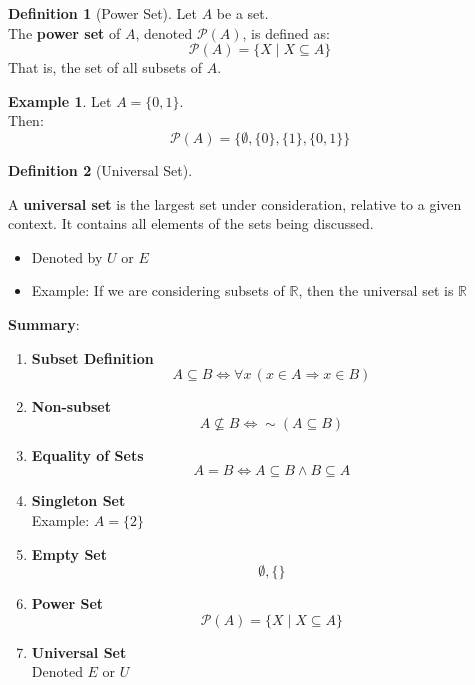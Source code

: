 \documentclass[
]{book}
\providecommand{\tightlist}{%
  \setlength{\itemsep}{0pt}\setlength{\parskip}{0pt}}
\theoremstyle{definition}
\newtheorem{definition}{Definition}[chapter]
\theoremstyle{definition}
\newtheorem{example}{Example}[chapter]
\theoremstyle{definition}
\theoremstyle{definition}
\theoremstyle{remark}
\begin{document}
\begin{definition}[Power Set]
\protect\hypertarget{def:unnamed-chunk-129}{}\label{def:unnamed-chunk-129}Let \(A\) be a set.\\
The \textbf{power set} of \(A\), denoted \(\mathcal{P}(A)\), is defined as:
\[
\mathcal{P}(A) = \{X \mid X \subseteq A\}
\]
That is, the set of all subsets of \(A\).
\end{definition}

\begin{example}
\protect\hypertarget{exm:unnamed-chunk-130}{}\label{exm:unnamed-chunk-130}Let \(A = \{0, 1\}\).\\
Then:
\[
\mathcal{P}(A) = \{\emptyset, \{0\}, \{1\}, \{0, 1\}\}
\]
\end{example}

\begin{definition}[Universal Set]
\protect\hypertarget{def:unnamed-chunk-131}{}\label{def:unnamed-chunk-131}

A \textbf{universal set} is the largest set under consideration, relative to a given context. It contains all elements of the sets being discussed.

\begin{itemize}
\tightlist
\item
  Denoted by \(U\) or \(E\)
\item
  Example: If we are considering subsets of \(\mathbb{R}\), then the universal set is \(\mathbb{R}\)
\end{itemize}

\end{definition}

\textbf{Summary}:

\begin{enumerate}
\def\labelenumi{\arabic{enumi}.}
\item
  \textbf{Subset Definition}\\
  \[
  A \subseteq B \iff \forall x \, (x \in A \Rightarrow x \in B)
  \]
\item
  \textbf{Non-subset}\\
  \[
  A \nsubseteq B \iff \sim (A \subseteq B)
  \]
\item
  \textbf{Equality of Sets}\\
  \[
  A = B \iff A \subseteq B \land B \subseteq A
  \]
\item
  \textbf{Singleton Set}\\
  Example: \(A = \{2\}\)
\item
  \textbf{Empty Set}\\
  \[   \emptyset,\{\}   \]
\item
  \textbf{Power Set}\\
  \[
  \mathcal{P}(A) = \{X \mid X \subseteq A\}
  \]
\item
  \textbf{Universal Set}\\
  Denoted \(E\) or \(U\)
\end{enumerate}
\end{document}
